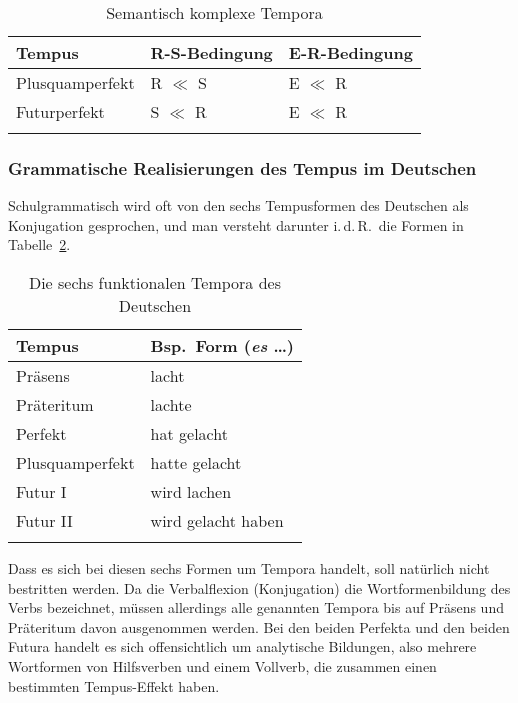 \begin{table}
  \centering
  \begin{tabular}{lll}
    \lsptoprule
    \textbf{Tempus} & \textbf{R-S-Bedingung} & \textbf{E-R-Bedingung} \\
    \midrule
	Plusquamperfekt & R $\ll$ S & E $\ll$ R \\
	Futurperfekt & S $\ll$ R & E $\ll$ R \\
    \lspbottomrule
  \end{tabular}
  \caption{Semantisch komplexe Tempora}
  \label{tab:komplextemp}
\end{table}

\subsubsection{Grammatische Realisierungen des Tempus im Deutschen}

\label{sec:deutemp}

Schulgrammatisch wird oft von den sechs Tempusformen des Deutschen als Konjugation gesprochen, und man versteht darunter i.\,d.\,R.\ die Formen in Tabelle~\ref{tab:sechstempora}.

\begin{table}
  \centering
  \begin{tabular}{ll}
    \lsptoprule
    \textbf{Tempus} & \textbf{Bsp.\ Form} (\textit{es} \ldots)\\
    \midrule
    Präsens & lacht \\
    Präteritum & lachte \\
    Perfekt & hat gelacht \\
    Plusquamperfekt & hatte gelacht \\
    Futur I & wird lachen \\
    Futur II & wird gelacht haben \\
    \lspbottomrule
  \end{tabular}
  \caption{Die sechs funktionalen Tempora des Deutschen}
  \label{tab:sechstempora}
\end{table}

Dass es sich bei diesen sechs Formen um Tempora handelt, soll natürlich nicht bestritten werden.
Da die Verbalflexion (Konjugation) die Wortformenbildung des Verbs bezeichnet, müssen allerdings alle genannten Tempora bis auf Präsens und Präteritum davon ausgenommen werden.
Bei den beiden Perfekta und den beiden Futura handelt es sich offensichtlich um analytische Bildungen, also mehrere Wortformen von Hilfsverben und einem Vollverb, die zusammen einen bestimmten Tempus-Effekt haben.

